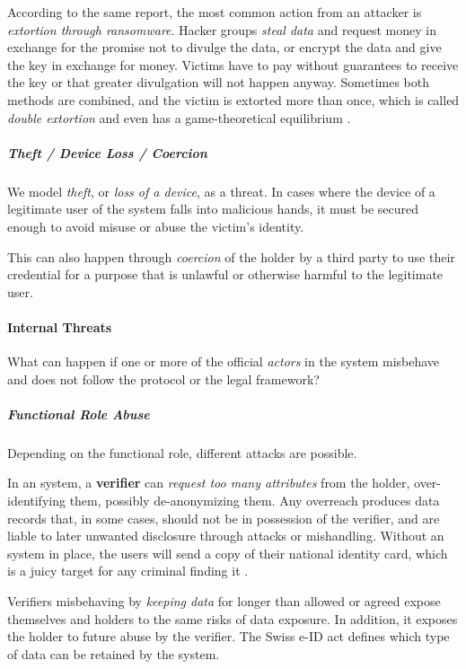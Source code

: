 According to the same report, the most common action from an attacker is \emph{extortion through ransomware}.
Hacker groups \emph{steal data} and request money in exchange for the promise not to divulge the data,
or encrypt the data and give the key in exchange for money.
Victims have to pay without guarantees to receive the key or that greater divulgation will not happen anyway.
Sometimes both methods are combined, and the victim is extorted more than once, which is called \emph{double extortion}
and even has a game-theoretical equilibrium \cite{Meurs24}.

\subparagraph{Theft / Device Loss / Coercion}

We model \emph{theft}, or \emph{loss of a device}, as a threat.
In cases where the device of a legitimate user of the system falls into malicious hands, it must be secured enough to avoid misuse or abuse the victim's identity.

This can also happen through \emph{coercion} of the holder by a third party to use their
credential for a purpose that is unlawful or otherwise harmful to the legitimate user.

\paragraph{Internal Threats}
\label{p:internal-threats}

What can happen if one or more of the official \emph{actors} in the \eid system
misbehave and does not follow the protocol or the legal framework?

\subparagraph{Functional Role Abuse}

Depending on the functional role, different attacks are possible. 

In an \eid system, a \textbf{verifier} can \emph{request too many attributes} 
from the holder, over-identifying them, possibly de-anonymizing them. 
Any overreach produces data records that, in some cases, should not be in possession of the verifier, and are liable to later unwanted disclosure through attacks or mishandling.
Without an \eid system in place, the users will send a copy of their national identity card, which is a juicy target for any criminal finding it \cite{Tea25}.

Verifiers misbehaving by \emph{keeping data} for longer than allowed or agreed expose themselves and holders to the same risks of data exposure. 
In addition, it exposes the holder to future abuse by the verifier.
The Swiss e-ID act defines which type of data can be retained by the system.

